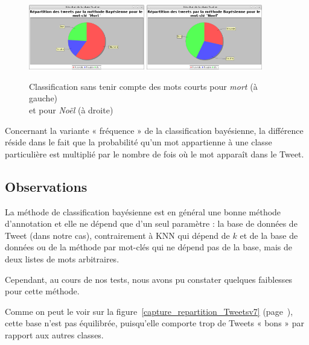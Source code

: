 \documentclass[12pt,a4paper]{report}
\begin{document}
\begin{figure}
	\centering
	\includegraphics[width=0.45\textwidth]{img/classificationMortpastouslesMots.png}
	\includegraphics[width=0.45\textwidth]{img/classificationpastouslesmotsnoel.png}
	\caption{Classification sans tenir compte des mots courts pour
	\textit{mort} (à gauche)\\et pour \textit{Noël} (à droite)}
	\label{bayes_pas_tous_les_mots}
\end{figure}

Concernant la variante « fréquence » de la classification bayésienne, la
différence réside dans le fait que la probabilité qu'un mot appartienne à une
classe particulière est multiplié par le nombre de fois où le mot apparaît dans
le Tweet.

\subsection{Observations}
La méthode de classification bayésienne est en général une bonne méthode
d'annotation et elle ne dépend que d'un seul paramètre : la base de données de
Tweet (dans notre cas), contrairement à KNN qui dépend de $k$ et de la base de
données ou de la méthode par mot-clés qui ne dépend pas de la base, mais de deux
listes de mots arbitraires.

Cependant, au cours de nos tests, nous avons pu constater quelques faiblesses
pour cette méthode.

Comme on peut le voir sur la figure~\ref{capture_repartition_Tweetsv7}
(page~\pageref{capture_repartition_Tweetsv7}), cette
base n'est pas équilibrée, puisqu'elle comporte trop de Tweets « bons » par
rapport aux autres classes.
\end{document}
